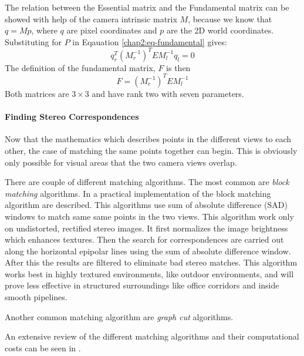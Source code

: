 The relation between the Essential matrix and the Fundamental matrix can be showed with
help of the camera intrinsic matrix $M$, because we know that $q = Mp$, where $q$ are
pixel coordinates and $p$ are the 2D world coordinates. Substituting for $P$ in Eqauation
\eqref{chap2:eq-fundamental} gives: \cite{openCV}
\begin{equation}
    q_r^T(M_r^{-1})^T E M_l^{-1} q_l = 0
\end{equation}
The definition of the fundamental matrix, $F$ is then
\begin{equation}
    F = (M_r^{-1})^T E M_l^{-1}
\end{equation}
Both matrices are $3\times3$ and have rank two with seven parameters.


\paragraph{Finding Stereo Correspondences}
Now that the mathematics which describes points in the different views to each other, the
case of matching the same points together can begin. This is obviously only possible for
visual areas that the two camera views overlap. 

There are couple of different matching algorithms. The most common are \emph{block
matching} algorithms. In \cite{konolige} a practical implementation of the block
matching algorithm are described. This algorithms use sum of absolute difference (SAD) windows to match same
same points in the two views. This algorithm work only on undistorted, rectified stereo
images. It first normalizes the image brightness which enhances textures. Then the search
for correspondences are carried out along the horizontal epipolar lines using the sum of
absolute difference window. After this the results are filtered to eliminate bad stereo
matches. This algorithm works best in highly textured environments, like outdoor
environments, and will prove less effective in structured surroundings like office
corridors and inside smooth pipelines. 

Another common matching algorithm are \emph{graph cut} algorithms. 

An extensive review of the different matching algorithms and their computational costs
can be seen in \cite{stereo-algorithms}.



